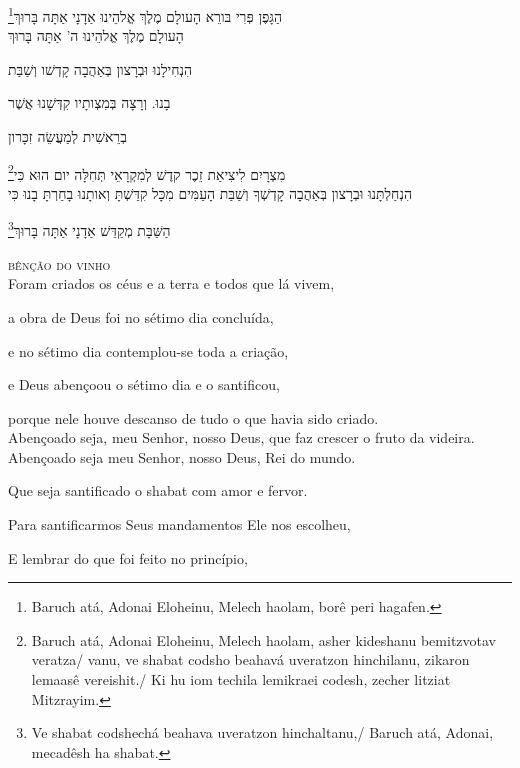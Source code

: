 \footnote{Baruch atá, Adonai Eloheinu, Melech haolam, borê peri hagafen.}הַגָּפֶן פְּרִי בּורֵא הָעולָם מֶלֶךְ אֱלהֵינוּ אַדָנָי אַתָּה בָּרוּךְ\\[10pt] 

הָעולָם מֶלֶךְ אֱלהֵינוּ ה' אַתָּה בָּרוּךְ

הִנְחִילָנוּ וּבְרָצון בְּאַהֲבָה קָדְשׁו וְשַׁבַּת

בָנוּ. וְרָצָה בְּמִצְותָיו קִדְּשָׁנוּ אֲשֶׁר

בְרֵאשִׁית לְמַעֲשֵׂה זִכָּרון

\footnote{Baruch atá, Adonai Eloheinu, Melech haolam, asher kideshanu bemitzvotav veratza/
vanu, ve shabat codsho beahavá uveratzon hinchilanu, zikaron lemaasê vereishit./
Ki hu iom techila lemikraei codesh, zecher litziat Mitzrayim.}מִצְרָיִם לִיצִיאַת זֵכֶר קדֶשׁ לְמִקְרָאֵי תְּחִלָּה יום הוּא כִּי\\[10pt]

הִנְחַלְתָּנוּ וּבְרָצון בְּאַהֲבָה קָדְשְׁךָ וְשַׁבַּת הָעַמִּים מִכָּל קִדַּשְׁתָּ וְאותָנוּ בָחַרְתָּ בָנוּ כִּי
\medskip

\footnote{Ve shabat codshechá beahava uveratzon hinchaltanu,/
Baruch atá, Adonai, mecadêsh ha shabat.}הַשַּׁבָּת מְקַדֵּשׁ אַדָנָי אַתָּה בָּרוּךְ

\movetooddpage
\raggedright


\textsc{bênção do vinho}\\[15pt]

Foram criados os céus e a terra e todos que lá vivem,

a obra de Deus foi no sétimo dia concluída,

e no sétimo dia contemplou-se toda a criação,

e Deus abençoou o sétimo dia e o santificou,

porque nele houve descanso de tudo o que havia sido \qb{}criado.\\[10pt]

Abençoado seja, meu Senhor, nosso Deus, que faz \qb{}crescer o fruto da
videira.\\[10pt]

Abençoado seja meu Senhor, nosso Deus, Rei do mundo.

Que seja santificado o shabat com amor e fervor.

Para santificarmos Seus mandamentos Ele nos escolheu,

E lembrar do que foi feito no princípio,


